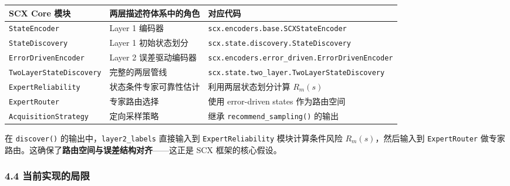 \documentclass[
  12pt,
]{ctexart}
\begin{document}
\begin{longtable}[]{@{}
  >{\raggedright\arraybackslash}p{}
  >{\raggedright\arraybackslash}p{}
  >{\raggedright\arraybackslash}p{}@{}}
\toprule\noalign{}
\begin{minipage}[b]{\linewidth}\raggedright
SCX Core 模块
\end{minipage} & \begin{minipage}[b]{\linewidth}\raggedright
两层描述符体系中的角色
\end{minipage} & \begin{minipage}[b]{\linewidth}\raggedright
对应代码
\end{minipage} \\
\midrule\noalign{}
\endhead
\bottomrule\noalign{}
\endlastfoot
\texttt{StateEncoder} & Layer 1 编码器 &
\texttt{scx.encoders.base.SCXStateEncoder} \\
\texttt{StateDiscovery} & Layer 1 初始状态划分 &
\texttt{scx.state.discovery.StateDiscovery} \\
\texttt{ErrorDrivenEncoder} & Layer 2 误差驱动编码器 &
\texttt{scx.encoders.error\_driven.ErrorDrivenEncoder} \\
\texttt{TwoLayerStateDiscovery} & 完整的两层管线 &
\texttt{scx.state.two\_layer.TwoLayerStateDiscovery} \\
\texttt{ExpertReliability} & 状态条件专家可靠性估计 &
利用两层状态划分计算 \(R_m(s)\) \\
\texttt{ExpertRouter} & 专家路由选择 & 使用 error-driven states
作为路由空间 \\
\texttt{AcquisitionStrategy} & 定向采样策略 & 继承
\texttt{recommend\_sampling()} 的输出 \\
\end{longtable}

在 \texttt{discover()} 的输出中，\texttt{layer2\_labels} 直接输入到
\texttt{ExpertReliability} 模块计算条件风险 \(R_m(s)\)，然后输入到
\texttt{ExpertRouter}
做专家路由。这确保了\textbf{路由空间与误差结构对齐}------这正是 SCX
框架的核心假设。

\subsubsection{4.4
当前实现的局限}\label{ux5f53ux524dux5b9eux73b0ux7684ux5c40ux9650}
\end{document}
